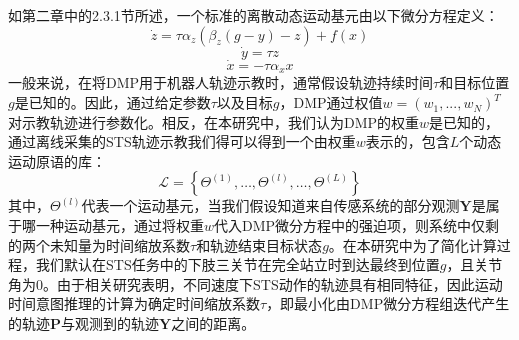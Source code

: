 如第二章中的2.3.1节所述，一个标准的离散动态运动基元由以下微分方程定义：
\begin{equation}
    \dot{z}=\tau \alpha_z\left(\beta_z(g-y)-z\right)+f(x)
    \label{eq:4-3}
\end{equation}
\begin{equation}
    \dot{y}=\tau z 
    \label{eq:4-4}
\end{equation}
\begin{equation}
    \dot{x}=-\tau \alpha_x x
    \label{eq:4-5}
\end{equation}
一般来说，在将DMP用于机器人轨迹示教时，通常假设轨迹持续时间$τ$和目标位置$g$是已知的。因此，通过给定参数$τ$以及目标$g$，DMP通过权值$w=(w_1,...,w_N)^T$对示教轨迹进行参数化。相反，在本研究中，我们认为DMP的权重$w$是已知的，通过离线采集的STS轨迹示教我们得可以得到一个由权重$w$表示的，包含$L$个动态运动原语的库：
\begin{equation}
    \mathscr{L}=\left\{\Theta^{(1)}, \ldots, \Theta^{(l)}, \ldots, \Theta^{(L)}\right\}
\end{equation}
其中，$\Theta^{(l)}$代表一个运动基元，当我们假设知道来自传感系统的部分观测$\mathbf{Y}$是属于哪一种运动基元，通过将权重$w$代入DMP微分方程中的强迫项，则系统中仅剩的两个未知量为时间缩放系数$\tau$和轨迹结束目标状态$g$。在本研究中为了简化计算过程，我们默认在STS任务中的下肢三关节在完全站立时到达最终到位置$g$，且关节角为0。由于相关研究表明，不同速度下STS动作的轨迹具有相同特征，因此运动时间意图推理的计算为确定时间缩放系数$\tau$，即最小化由DMP微分方程组迭代产生的轨迹$\mathbf{P}$与观测到的轨迹$\mathbf{Y}$之间的距离。

